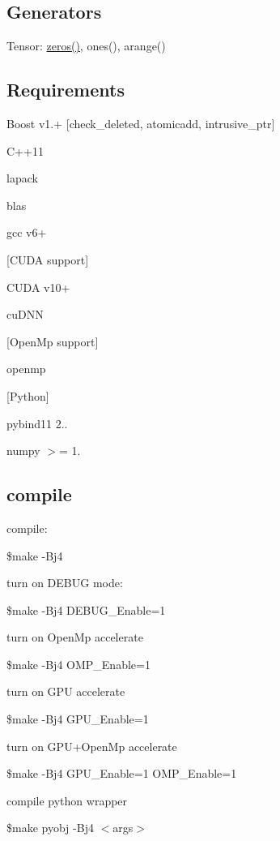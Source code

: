\subsection*{Generators}

Tensor\+: \hyperlink{namespacecytnx_ab8a79a03fb0465f3eb2641017f3f1755}{zeros()}, ones(), arange()

\subsection*{Requirements}


\begin{DoxyItemize}
\item Boost v1.+ \mbox{[}check\+\_\+deleted, atomicadd, intrusive\+\_\+ptr\mbox{]}
\item C++11
\item lapack
\item blas
\item gcc v6+
\end{DoxyItemize}

\mbox{[}C\+U\+DA support\mbox{]}
\begin{DoxyItemize}
\item C\+U\+DA v10+
\item cu\+D\+NN
\end{DoxyItemize}

\mbox{[}Open\+Mp support\mbox{]}
\begin{DoxyItemize}
\item openmp
\end{DoxyItemize}

\mbox{[}Python\mbox{]}
\begin{DoxyItemize}
\item pybind11 2..
\item numpy $>$= 1.
\end{DoxyItemize}

\subsection*{compile}


\begin{DoxyItemize}
\item compile\+:

\$make -\/\+Bj4
\item turn on D\+E\+B\+UG mode\+:

\$make -\/\+Bj4 D\+E\+B\+U\+G\+\_\+\+Enable=1
\item turn on Open\+Mp accelerate

\$make -\/\+Bj4 O\+M\+P\+\_\+\+Enable=1
\item turn on G\+PU accelerate

\$make -\/\+Bj4 G\+P\+U\+\_\+\+Enable=1
\item turn on G\+P\+U+\+Open\+Mp accelerate

\$make -\/\+Bj4 G\+P\+U\+\_\+\+Enable=1 O\+M\+P\+\_\+\+Enable=1
\item compile python wrapper

\$make pyobj -\/\+Bj4 $<$args$>$
\end{DoxyItemize}

